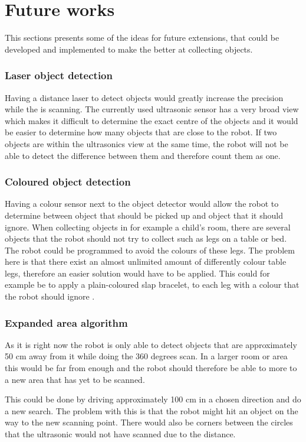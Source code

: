 \section{Future works} \label{sec:future_works}
This sections presents some of the ideas for future extensions, that could be developed and implemented to make the \projname{} better at collecting objects. 

\subsubsection{Laser object detection}
Having a distance laser to detect objects would greatly increase the precision while the \projname{} is scanning. The currently used ultrasonic sensor has a very broad view which makes it difficult to determine the exact centre of the objects and it would be easier to determine how many objects that are close to the robot. If two objects are within the ultrasonics view at the same time, the robot will not be able to detect the difference between them and therefore count them as one.

\subsubsection{Coloured object detection}
Having a colour sensor next to the object detector would allow the robot to determine between object that should be picked up and object that it should ignore. When collecting objects in for example a child's room, there are several objects that the robot should not try to collect such as legs on a table or bed. The robot could be programmed to avoid the colours of these legs. The problem here is that there exist an almost unlimited amount of differently colour table legs, therefore an easier solution would have to be applied. This could for example be to apply a plain-coloured slap bracelet, to each leg with a colour that the robot should ignore \citep{slap_bracelet}.

\subsubsection{Expanded area algorithm}
As it is right now the robot is only able to detect objects that are approximately 50 cm away from it while doing the 360 degrees scan. In a larger room or area this would be far from enough and the robot should therefore be able to more to a new area that has yet to be scanned.

This could be done by driving approximately 100 cm in a chosen direction and do a new search. The problem with this is that the robot might hit an object on the way to the new scanning point. There would also be corners between the circles that the ultrasonic would not have scanned due to the distance.

